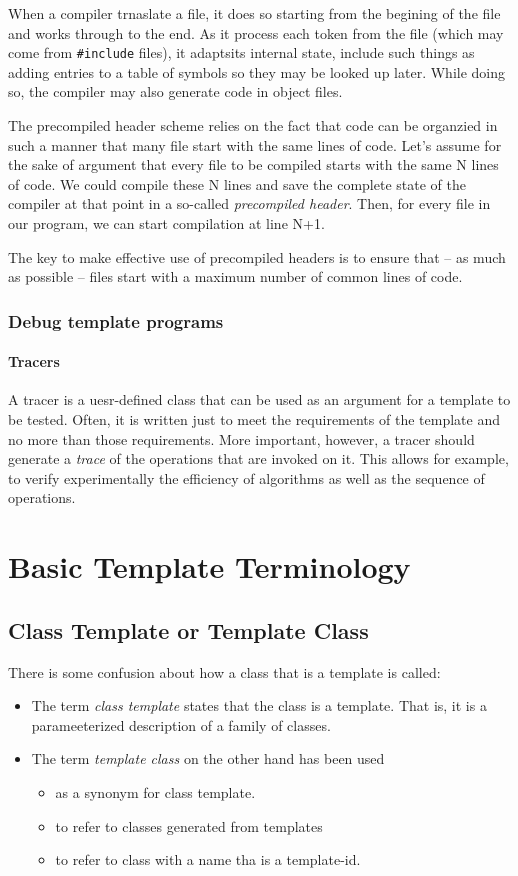 \documentclass[a4paper,12pt]{book}
\begin{document}
When a compiler trnaslate a file, it does so starting from the begining of the file and works through to the end. As it process each token from the file (which may come from \verb|#include| files), it adaptsits internal state, include such things as adding entries to a table of symbols so they may be looked up later. While doing so, the compiler may also generate code in object files.

The precompiled header scheme relies on the fact that code can be organzied in such a manner that many file start with the same lines of code. Let's assume for the sake of argument that every file to be compiled starts with the same N lines of code. We could compile these N lines and save the complete state of the compiler at that point in a so-called \emph{precompiled header}. Then, for every file in our program, we can start compilation at line N+1. 

The key to make effective use of precompiled headers is to ensure that -- as much as possible -- files start with a maximum number of common lines of code.

\subsubsection{Debug template programs}
\paragraph{Tracers}

A tracer is a uesr-defined class that can be used as an argument for a template to be tested. Often, it is written just to meet the requirements of the template and no more than those requirements. More important, however, a tracer should generate a \emph{trace} of the operations that are invoked on it. This allows for example, to verify experimentally the efficiency of algorithms as well as the sequence of operations.
\section{Basic Template Terminology}
\subsection{Class Template or Template Class}
There is some confusion about how a class that is a template is called:
\begin{itemize}
\item The term \emph{class template} states that the class is a template. That is, it is a parameeterized description of a family of classes.
\item The term \emph{template class} on the other hand has been used
	\begin{itemize}
	\item as a synonym for class template.
	\item to refer to classes generated from templates
	\item to refer to class with a name tha is a template-id.
	\end{itemize}
\end{itemize}
\end{document}
